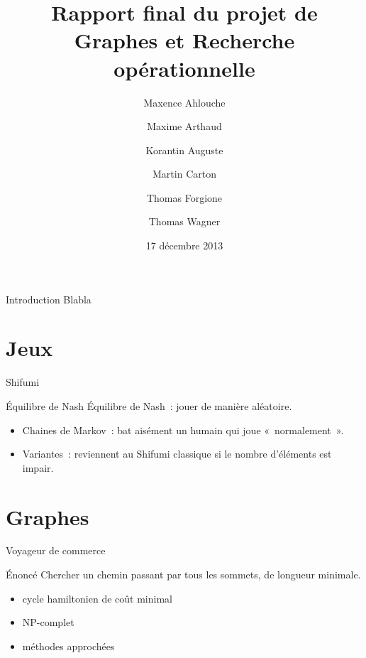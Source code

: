 \documentclass{beamer}
\title[Rapport final de GRO]
      {Rapport final du projet de\\Graphes et Recherche opérationnelle}
\institute{Enseeiht}
\author
  [Ahlouche \and Arthaud \and Auguste
    \and Carton \and Forgione \and Wagner]
  {Maxence Ahlouche \and Maxime Arthaud \and Korantin Auguste
    \and Martin Carton \and Thomas Forgione \and Thomas Wagner}
\date{17 décembre 2013}
\begin{document}
\begin{frame}
  \titlepage
\end{frame}

\begin{frame}{Introduction}
  Blabla
\end{frame}

\section{Jeux}

\begin{frame}{Shifumi}
    \begin{block}{Équilibre de Nash}
        Équilibre de Nash~: jouer de manière aléatoire.
    \end{block}

    \begin{itemize}
        \item Chaines de Markov~: bat aisément un humain qui joue «~normalement~».
        \item Variantes~: reviennent au Shifumi classique si le nombre d'éléments est impair.
    \end{itemize}
\end{frame}

\section{Graphes}

\begin{frame}{Voyageur de commerce}
\end{frame}

\begin{frame}{Énoncé}
    Chercher un chemin passant par tous les sommets, de longueur minimale.
    \begin{itemize}
        \item cycle hamiltonien de coût minimal
        \item NP-complet
        \item méthodes approchées
    \end{itemize}
\end{frame}
\end{document}
